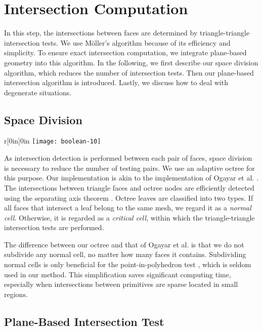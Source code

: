 \section{Intersection Computation}

\label{section:isect}

In this step, the intersections between faces are determined by triangle-triangle intersection tests. We use  M\"{o}ller's algorithm \cite{moller1997fast} because of its efficiency and simplicity. To ensure exact intersection computation, we integrate plane-based geometry into this algorithm. In the following, we first describe our space division algorithm, which reduces the number of intersection tests. Then our plane-based intersection algorithm is introduced. Lastly, we discuss how to deal with degenerate situations.

\subsection{Space Division}
\begin{wrapfigure}{r}[0in]{0in}
\texttt{[image: boolean-10]}
\end{wrapfigure}

As intersection detection is performed between each pair of faces, space division is necessary to reduce the number of testing pairs. We use an adaptive octree for this purpose. Our implementation is akin to the implementation of Ogayar et al. \cite{ogayar2015deferred}. The intersections between triangle faces and octree nodes are efficiently detected using the separating axis theorem \cite{gottschalk1996obbtree}. Octree leaves are classified into two types. If all faces that intersect a leaf belong to the same mesh, we regard it as a \emph{normal cell}. Otherwise, it is regarded as a \emph{critical cell}, within which the triangle-triangle intersection tests are performed.


The difference between our octree and that of Ogayar et al. is that we do not subdivide any normal cell, no matter how many faces it contains. Subdividing normal cells is only beneficial for the point-in-polyhedron test \cite{frisken2002simple}, which is seldom used in our method. This simplification saves significant computing time, especially when intersections between primitives are sparse located in small regions.

\subsection{Plane-Based Intersection Test}

